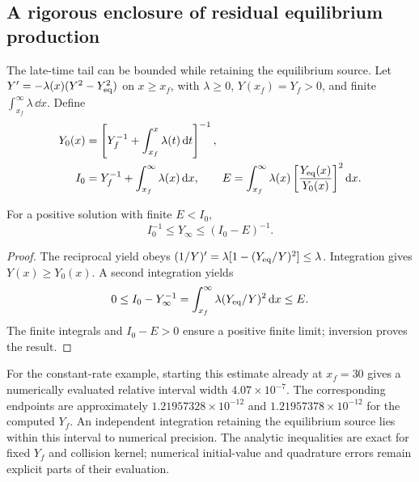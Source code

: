 \subsection{A rigorous enclosure of residual equilibrium production}
\label{sec:thermal-tail-bound}
The late-time tail can be bounded while retaining the equilibrium source. Let $Y'=-\lambda(x)(Y^2-Y_{\rm eq}^2)$ on $x\geq x_f$, with $\lambda\geq0$, $Y(x_f)=Y_f>0$, and finite $\int_{x_f}^\infty\lambda\,\dd x$. Define
\begin{align}
Y_0(x)&=\left[Y_f^{-1}+\int_{x_f}^x\lambda(t)\,\mathrm{d} t\right]^{-1},\\
I_0&=Y_f^{-1}+\int_{x_f}^\infty\lambda(x)\,\mathrm{d} x,\qquad
E=\int_{x_f}^\infty\lambda(x)\left[\frac{Y_{\rm eq}(x)}{Y_0(x)}\right]^2\mathrm{d} x.
\end{align}
\begin{proposition}\label{prop:thermal-tail}
For a positive solution with finite $E<I_0$,
\begin{equation}\label{eq:thermal-tail-bracket}
\boxed{I_0^{-1}\leq Y_\infty\leq(I_0-E)^{-1}.}
\end{equation}
\end{proposition}
\begin{proof}
The reciprocal yield obeys $(1/Y)'=\lambda[1-(Y_{\rm eq}/Y)^2]\leq\lambda$. Integration gives $Y(x)\geq Y_0(x)$. A second integration yields
\[
0\leq I_0-Y_\infty^{-1}
=\int_{x_f}^\infty\lambda(Y_{\rm eq}/Y)^2\,\mathrm{d} x\leq E.
\]
The finite integrals and $I_0-E>0$ ensure a positive finite limit; inversion proves the result.
\end{proof}
For the constant-rate example, starting this estimate already at $x_f=30$ gives a numerically evaluated relative interval width $4.07\times10^{-7}$. The corresponding endpoints are approximately $1.21957328\times10^{-12}$ and $1.21957378\times10^{-12}$ for the computed $Y_f$. An independent integration retaining the equilibrium source lies within this interval to numerical precision. The analytic inequalities are exact for fixed $Y_f$ and collision kernel; numerical initial-value and quadrature errors remain explicit parts of their evaluation.

